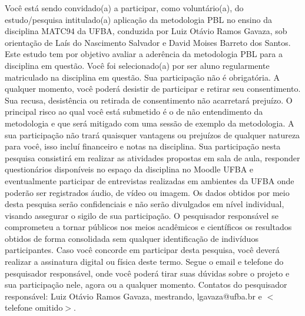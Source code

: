 \acresetall
\label{termo-ciencia}
Você está sendo convidado(a) a participar, como voluntário(a), do estudo/pesquisa
intitulado(a) aplicação da metodologia PBL no ensino da disciplina MATC94 da UFBA,
conduzida por Luiz Otávio Ramos Gavaza, sob orientação de Laís do Nascimento Salvador
e David Moises Barreto dos Santos.
Este estudo tem por objetivo avaliar a aderência da metodologia PBL para
a disciplina em questão.
Você foi selecionado(a) por ser aluno regularmente matriculado na disciplina em questão.
Sua participação não é obrigatória.
A qualquer momento, você poderá desistir de participar e retirar seu consentimento.
Sua recusa, desistência ou retirada de consentimento não acarretará prejuízo.
O principal risco ao qual você está submetido é o de não entendimento da metodologia
e que será mitigado com uma sessão de exemplo da metodologia.
A sua participação não trará quaisquer vantagens ou prejuízos de qualquer natureza
para você, isso incluí financeiro e notas na disciplina.
Sua participação nesta pesquisa consistirá em realizar as atividades propostas
em sala de aula, responder questionários disponíveis no espaço da disciplina
no Moodle UFBA e eventualmente participar de entrevistas realizadas em ambientes
da UFBA onde poderão ser registrados áudio, de vídeo ou imagem.
Os dados obtidos por meio desta pesquisa serão confidenciais e não serão
divulgados em nível individual, visando assegurar o sigilo de sua participação.
O pesquisador responsável se comprometeu a tornar públicos nos meios acadêmicos
e científicos os resultados obtidos de forma consolidada sem qualquer identificação
de indivíduos participantes.
Caso você concorde em participar desta pesquisa, você deverá realizar a
assinatura digital ou física deste termo.
Segue o email e telefone do pesquisador responsável, onde você poderá tirar
suas dúvidas sobre o projeto e sua participação nele, agora ou
a qualquer momento.
Contatos do pesquisador responsável: Luiz Otávio Ramos Gavaza, mestrando,
lgavaza@ufba.br e $<$telefone omitido$>$.
